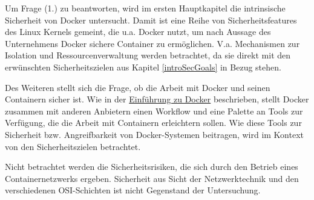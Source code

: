 \documentclass[../main.tex]{subfiles}
\begin{document}

  Um Frage (1.) zu beantworten, wird im ersten Hauptkapitel die intrinsische Sicherheit von Docker untersucht. Damit ist eine Reihe von Sicherheitsfeatures des Linux Kernels gemeint, die u.a. Docker nutzt, um nach Aussage des Unternehmens Docker sichere Container zu ermöglichen. V.a. Mechanismen zur Isolation und Ressourcenverwaltung werden betrachtet, da sie direkt mit den erwünschten Sicherheitszielen aus Kapitel \ref{introSecGoals} in Bezug stehen.

  Des Weiteren stellt sich die Frage, ob die Arbeit mit Docker und seinen Containern sicher ist. Wie in der \hyperref[dockerIntro]{Einführung zu Docker} beschrieben, stellt Docker zusammen mit anderen Anbietern einen Workflow und eine Palette an Tools zur Verfügung, die die Arbeit mit Containern erleichtern sollen. Wie diese Tools zur Sicherheit bzw. Angreifbarkeit von Docker-Systemen beitragen, wird im Kontext von den Sicherheitszielen betrachtet.

  Nicht betrachtet werden die Sicherheitsrisiken, die sich durch den Betrieb eines Containernetzwerks ergeben. Sicherheit aus Sicht der Netzwerktechnik und den verschiedenen OSI-Schichten ist nicht Gegenstand der Untersuchung.
\end{document}
